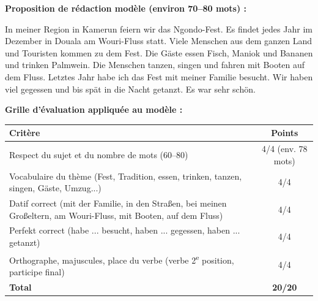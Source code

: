 \documentclass[11pt]{article}
\begin{document}
\begin{corrige}
\textbf{Proposition de rédaction modèle (environ 70--80 mots) :}

\begin{textebox}
In meiner Region in Kamerun feiern wir das Ngondo-Fest. Es findet jedes Jahr im Dezember in Douala am Wouri-Fluss statt. Viele Menschen aus dem ganzen Land und Touristen kommen zu dem Fest. Die Gäste essen Fisch, Maniok und Bananen und trinken Palmwein. Die Menschen tanzen, singen und fahren mit Booten auf dem Fluss. Letztes Jahr habe ich das Fest mit meiner Familie besucht. Wir haben viel gegessen und bis spät in die Nacht getanzt. Es war sehr schön.
\end{textebox}

\textbf{Grille d'évaluation appliquée au modèle :}
\begin{center}
\begin{tabularx}{\linewidth}{|X|c|}
\hline
\rowcolor{popblueL} \textbf{Critère} & \textbf{Points} \\
\hline
Respect du sujet et du nombre de mots (60--80) & 4/4 (env. 78 mots) \\
\hline
Vocabulaire du thème (Fest, Tradition, essen, trinken, tanzen, singen, Gäste, Umzug...) & 4/4 \\
\hline
Datif correct (mit der Familie, in den Straßen, bei meinen Großeltern, am Wouri-Fluss, mit Booten, auf dem Fluss) & 4/4 \\
\hline
Perfekt correct (habe ... besucht, haben ... gegessen, haben ... getanzt) & 4/4 \\
\hline
Orthographe, majuscules, place du verbe (verbe 2\textsuperscript{e} position, participe final) & 4/4 \\
\hline
\textbf{Total} & \textbf{20/20} \\
\hline
\end{tabularx}
\end{center}


\end{corrige}
\end{document}
